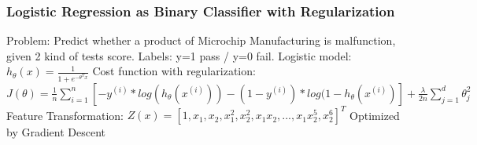 \begin{frame}
\frametitle{Logistic Regression as Binary Classifier with Regularization}
Problem: Predict whether a product of Microchip Manufacturing is malfunction, given 2 kind of tests score. Labels: y=1 pass / y=0 fail.\newline\newline
Logistic model: $h_\theta(x)=\frac{1}{1+e^{-\theta^Tx}}$\newline\newline
Cost function with regularization: \newline\newline
$J(\theta)=\frac{1}{n}\sum\limits_{i=1}^n[-y^{(i)}*log(h_\theta(x^{(i)}))-(1-y^{(i)})*log(1-h_\theta(x^{(i)})]+\frac{\lambda}{2n}\sum\limits_{j=1}^d\theta_j^2$\newline\newline
Feature Transformation: $Z(x)=[1,x_1,x_2,x_1^2,x_2^2,x_1x_2,...,x_1x_2^5,x_2^6]^T$\newline\newline
Optimized by Gradient Descent\newline\newline

\end{frame}

